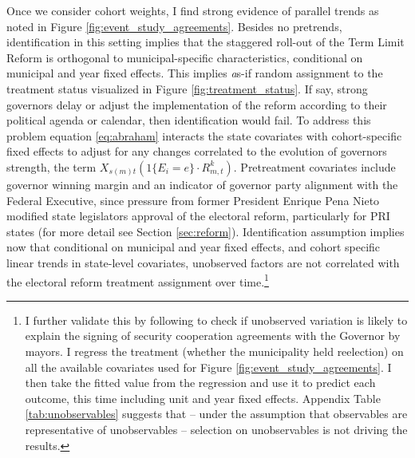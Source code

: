 \documentclass[12pt]{amsart}
\numberwithin{equation}{section}
\theoremstyle{definition}
\theoremstyle{definition}
\theoremstyle{definition}
\begin{document}
Once we consider cohort weights, I find strong evidence of parallel trends as noted in Figure \ref{fig:event_study_agreements}. Besides no pretrends, identification in this setting implies that the staggered roll-out of the Term Limit Reform is orthogonal to municipal-specific characteristics, conditional on municipal and year fixed effects. This implies {\emph as-if} random assignment to the treatment status visualized in Figure \ref{fig:treatment_status}. If say, strong governors delay or adjust the implementation of the reform according to their political agenda or calendar, then identification would fail. To address this problem equation \ref{eq:abraham} interacts the state covariates with cohort-specific fixed effects to adjust for any changes correlated to the evolution of governors strength, the term $X_{s(m)t} (1\{E_i=e\} \cdot R^k_{m,t})$. Pretreatment covariates include governor winning margin and an indicator of governor party alignment with the Federal Executive, since pressure from former President Enrique Pena Nieto modified state legislators approval of the electoral reform, particularly for PRI states (for more detail see Section \ref{sec:reform}). Identification assumption implies now that conditional on municipal and year fixed effects, and cohort specific linear trends in state-level covariates, unobserved factors are not correlated with the electoral reform treatment assignment over time.\footnote{I further validate this by following \citet{altonji_etal_2005} to check if unobserved variation is likely to explain the signing of security cooperation agreements with the Governor by mayors. I regress the treatment (whether the municipality held reelection) on all the available covariates used for Figure \ref{fig:event_study_agreements}. I then take the fitted value from the regression and use it to predict each outcome, this time including unit and year fixed effects. Appendix Table \ref{tab:unobservables} suggests that – under the assumption that observables are representative of unobservables – selection on unobservables is not driving the results.}   
\end{document}
